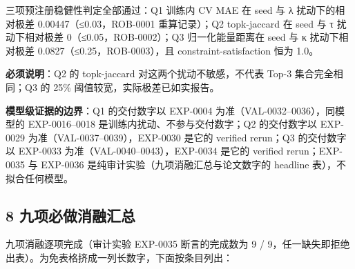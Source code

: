 \documentclass[
  11pt,
]{article}
\begin{document}
三项预注册稳健性判定全部通过：Q1 训练内 CV MAE 在 seed 与 λ
扰动下的相对极差 0.00447（≤0.03，ROB-0001 重算记录）；Q2 topk-jaccard 在
seed 与 τ 扰动下相对极差 0（≤0.05，ROB-0002）；Q3 归一化能量距离在 seed
与 κ 扰动下相对极差 0.0827（≤0.25，ROB-0003），且
constraint-satisfaction 恒为 1.0。

\textbf{必须说明}：Q2 的 topk-jaccard 对这两个扰动不敏感，不代表 Top-3
集合完全相同；Q3 的 25\% 阈值较宽，实际极差已如实报告。

\textbf{模型级证据的边界}：Q1 的交付数字以 EXP-0004
为准（VAL-0032--0036），同模型的 EXP-0016--0018
是训练内扰动、不参与交付数字；Q2 的交付数字以 EXP-0029
为准（VAL-0037--0039），EXP-0030 是它的 verified rerun；Q3 的交付数字以
EXP-0033 为准（VAL-0040--0043），EXP-0034 是它的 verified
rerun；EXP-0035 与 EXP-0036 是纯审计实验（九项消融汇总与论文数字的
headline 表），不拟合任何模型。

\subsection{8
九项必做消融汇总}\label{ux4e5dux9879ux5fc5ux505aux6d88ux878dux6c47ux603b}

九项消融逐项完成（审计实验 EXP-0035 断言的完成数为 9 /
9，任一缺失即拒绝出表）。为免表格挤成一列长数字，下面按条目列出：
\end{document}
